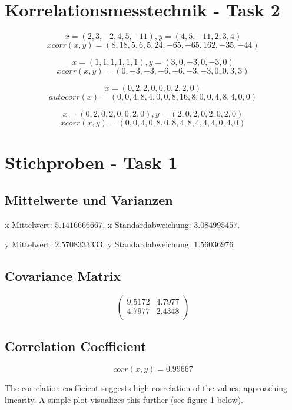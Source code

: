 \documentclass[10pt,a4paper]{article}
\begin{document}
\section*{Korrelationsmesstechnik - Task 2}

\[ x = (2,3,-2,4,5,-11), y = (4,5,-11,2,3,4) \]
\[ xcorr(x, y) = (8,18,5,6,5,24,-65,-65,162,-35,-44)\]

\[ x = (1,1,1,1,1,1), y = (3,0,-3,0,-3,0) \]
\[ xcorr(x, y) = (0, -3, -3, -6, -6, -3, -3, 0, 0, 3, 3)\]

\[ x = (0, 2, 2, 0, 0, 0, 2, 2, 0) \]
\[ autocorr(x) = (0,0,4,8,4,0,0,8,16,8,0,0,4,8,4,0,0) \]

\[ x = (0, 2, 0, 2, 0, 0, 2, 0), y = (2, 0, 2, 0, 2, 0, 2, 0) \]
\[ xcorr(x, y) = (0,0,4,0,8,0,8,4,8,4,4,4,0,4,0) \]

\section*{Stichproben - Task 1}

\subsection*{Mittelwerte und Varianzen}

x Mittelwert: $5.1416666667$, x Standardabweichung: $3.084995457$.

y Mittelwert: $2.5708333333$, y Standardabweichung: $1.56036976$

\subsection*{Covariance Matrix}

\[
\begin{pmatrix}
9.5172 & 4.7977 \\
4.7977 & 2.4348 \\
\end{pmatrix}
\]
\pagebreak
\subsection*{Correlation Coefficient}

\[
corr(x,y) = 0.99667
\]

The correlation coefficient suggests high correlation of the values, approaching linearity. A simple plot visualizes this further (see figure 1 below).
\end{document}
